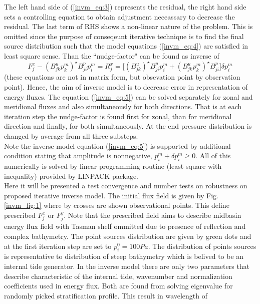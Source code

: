 \documentclass[12pt]{article}
\begin{document}
The left hand side of (\ref{invm_eq:3}) represents the residual, the right hand side sets a controlling equation to obtain adjustment neceassary to decrease the residual. The last term of RHS shows a non-linear nature of the problem. This is omitted since the purpose of conseqeunt iterative technique is to find the final source distribution such that the model equations (\ref{invm_eq:4}) are satisfied in least square sense. Than the ``nudge-factor" can be found as inverse of 
\begin{equation}
F_{j}^x - (B^u_{jk} p^m_k)^{\star} B^p_{ji}{p^m_i} = R_j^x = \Big[ (B^u_{jk} )^{\star} B^p_{ji} p^m_i + (B^u_{jk} p^m_k)^{\star} B^p_{ji} \Big] \delta p^m_i \label{invm_eq:5}
\end{equation}
(these equations are not in matrix form, but obsevation point by observation point).
Hence, the aim of inverse model is to decrease error in representation of energy fluxes. The equation (\ref{invm_eq:5}) can be solved separately for zonal and meridional fluxes and also simultaneously for both directions. That is at each iteration step the nudge-factor is found first for zonal, than for meridional direction and finally, for both simultaneously. At the end pressure distribution is changed by average from all three substeps.\\
Note the inverse model equation (\ref{invm_eq:5}) is supported by additional condition stating that 
amplitude is nonnegative, $p_i^m + \delta p_i^m \geq 0$. All of this numerically is solved by 
linear programming routine  (least square with inequality) provided by LINPACK package.\\
Here it will be presented a test convergence and number tests on robustness on proposed iterative 
inverse model. The initial flux field is given by Fig. \ref{invm_fig:1} where by crosses are shown 
observational points. This define prescribed $F_{j}^x$ or $F_{j}^y$. Note that the prescribed field 
aims to describe midbasin energy flux field with Tasman shelf ommitted due to presence of 
reflection and complex bathymetry. The point sources distribution are given by green dots and at 
the first iteration step are set to $p^0_i = 100 Pa$. The distribution of points sources is 
representative to distribution of steep bathymetry which is belived to be an internal tide 
generator. In the inverse model there are only two parameters that describe characteristic of the 
internal tide, wavenumber and normalization coefficients used in energy flux. Both are found from 
solving eigenvalue for randomly picked stratification profile. This result in wavelength of 
\end{document}
